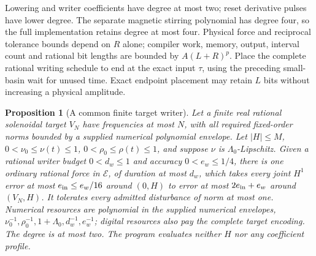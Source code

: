 \documentclass[11pt,a4paper]{amsart}
\newtheorem{proposition}[theorem]{Proposition}
\theoremstyle{definition}
\theoremstyle{remark}
\numberwithin{equation}{section}
\newcommand{\Ecal}{\mathcal E}
\begin{document}
Lowering and writer coefficients have degree at most two; reset derivative
pulses have lower degree. The separate magnetic stirring polynomial has
degree four, so the full implementation retains degree at most four.
Physical force and reciprocal tolerance bounds depend on $R$ alone;
compiler work, memory, output, interval count and rational bit lengths are
bounded by $A(L+R)^p$. Place the complete rational writing schedule to end
at the exact input $\tau$, using the preceding small-basin wait for unused
time. Exact endpoint placement may retain $L$ bits without increasing a
physical amplitude.

\begin{proposition}[A common finite target writer]\label{prop:writer}
Let a finite real rational solenoidal target $V_N$ have frequencies at most $N$, with all required fixed-order norms bounded by a supplied numerical polynomial envelope. Let $|H|\le M$, $0<\nu_0\le\nu(t)\le1$, $0<\rho_0\le\rho(t)\le1$, and suppose $\nu$ is $\Lambda_0$-Lipschitz. Given a rational writer budget $0<d_w\le1$ and accuracy $0<e_w\le1/4$, there is one ordinary rational force in $\Ecal$, of duration at most $d_w$, which takes every joint $H^1$ error at most $e_{\rm in}\le e_w/16$ around $(0,H)$ to error at most $2e_{\rm in}+e_w$ around $(V_N,H)$. It tolerates every admitted disturbance of norm at most one. Numerical resources are polynomial in the supplied numerical envelopes, $\nu_0^{-1},\rho_0^{-1},1+\Lambda_0,d_w^{-1},e_w^{-1}$; digital resources also pay the complete target encoding. The degree is at most two. The program evaluates neither $H$ nor any coefficient profile.
\end{proposition}
\end{document}
